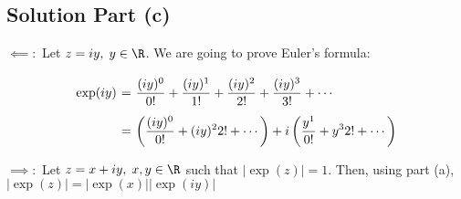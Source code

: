 \subsection*{Solution Part (c)}

$\boldsymbol{\impliedby:}$ Let $z = iy,\; y\in \R$. We are going to prove Euler's formula:
\[ \everymath{\displaystyle}
\arraycolsep=1.8pt\def\arraystretch{2.5}
\begin{array}{rcl}
    \exp(iy) & = & \frac{(iy)^0}{0!} + \frac{(iy)^1}{1!} + \frac{(iy)^2}{2!} + \frac{(iy)^3}{3!} + \cdots\\
    & = & \left( \frac{(iy)^0}{0!} + {(iy)^2}{2!} + \cdots \right) + i\left( \frac{y^1}{0!} + {y^3}{2!} + \cdots \right) 
\end{array} \]

$\boldsymbol{\implies:}$ Let $z = x+iy,\; x,y\in\R$ such that $|\exp(z)| = 1$. Then, using part (a), $|\exp(z)| = |\exp(x)| |\exp(iy)|$